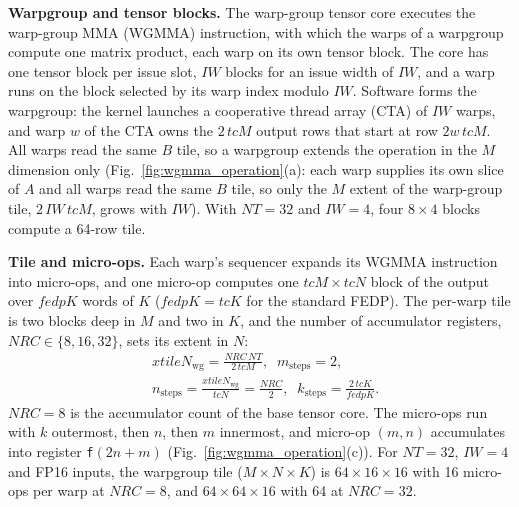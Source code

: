 \textbf{Warpgroup and tensor blocks.} The warp-group tensor core executes the warp-group MMA (WGMMA) instruction, with which the warps of a warpgroup compute one matrix product, each warp on its own tensor block. The core has one tensor block per issue slot, $\mathit{IW}$ blocks for an issue width of $\mathit{IW}$, and a warp runs on the block selected by its warp index modulo $\mathit{IW}$. Software forms the warpgroup: the kernel launches a cooperative thread array (CTA) of $\mathit{IW}$ warps, and warp $w$ of the CTA owns the $2\,\mathit{tcM}$ output rows that start at row $2w\,\mathit{tcM}$. All warps read the same $B$ tile, so a warpgroup extends the operation in the $M$ dimension only (Fig.~\ref{fig:wgmma_operation}(a): each warp supplies its own slice of $A$ and all warps read the same $B$ tile, so only the $M$ extent of the warp-group tile, $2\,\mathit{IW}\,\mathit{tcM}$, grows with $\mathit{IW}$). With $\mathit{NT}{=}32$ and $\mathit{IW}{=}4$, four $8{\times}4$ blocks compute a 64-row tile.

\textbf{Tile and micro-ops.} Each warp's sequencer expands its WGMMA instruction into micro-ops, and one micro-op computes one $\mathit{tcM}{\times}\mathit{tcN}$ block of the output over $\mathit{fedpK}$ words of $K$ ($\mathit{fedpK}{=}\mathit{tcK}$ for the standard FEDP). The per-warp tile is two blocks deep in $M$ and two in $K$, and the number of accumulator registers, $\mathit{NRC}\in\{8,16,32\}$, sets its extent in $N$:
\begin{equation}\label{eq:wg_tile}
\begin{aligned}
&\mathit{xtileN}_{\mathrm{wg}} = \tfrac{\mathit{NRC}\,\mathit{NT}}{2\,\mathit{tcM}},\;\;
m_{\mathrm{steps}} = 2,\\
&n_{\mathrm{steps}} = \tfrac{\mathit{xtileN}_{\mathrm{wg}}}{\mathit{tcN}} = \tfrac{\mathit{NRC}}{2},\;\;
k_{\mathrm{steps}} = \tfrac{2\,\mathit{tcK}}{\mathit{fedpK}}.
\end{aligned}
\end{equation}
$\mathit{NRC}{=}8$ is the accumulator count of the base tensor core. The micro-ops run with $k$ outermost, then $n$, then $m$ innermost, and micro-op $(m,n)$ accumulates into register \texttt{f}$(2n{+}m)$ (Fig.~\ref{fig:wgmma_operation}(c)). For $\mathit{NT}{=}32$, $\mathit{IW}{=}4$ and FP16 inputs, the warpgroup tile ($M{\times}N{\times}K$) is $64{\times}16{\times}16$ with 16 micro-ops per warp at $\mathit{NRC}{=}8$, and $64{\times}64{\times}16$ with 64 at $\mathit{NRC}{=}32$.

